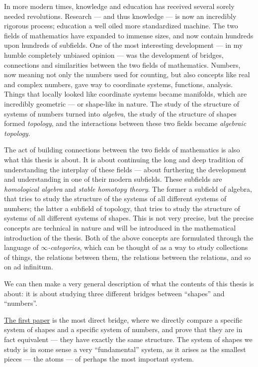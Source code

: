 In more modern times, knowledge and education has received several sorely needed revolutions. Research --- and thus knowledge --- is now an incredibly rigorous process; education a well oiled more standardized machine. The two fields of mathematics have expanded to immense sizes, and now contain hundreds upon hundreds of subfields. One of the most interesting development --- in my humble completely unbiased opinion --- was the development of bridges, connections and similarities between the two fields of mathematics. Numbers, now meaning not only the numbers used for counting, but also concepts like real and complex numbers, gave way to coordinate systems, functions, analysis. Things that locally looked like coordinate systems became manifolds, which are incredibly geometric --- or shape-like in nature. The study of the structure of systems of numbers turned into \emph{algebra}, the study of the structure of shapes formed \emph{topology}, and the interactions between these two fields became \emph{algebraic topology}. 

The act of building connections between the two fields of mathematics is also what this thesis is about. It is about continuing the long and deep tradition of understanding the interplay of these fields --- about furthering the development and understanding in one of their modern subfields. These subfields are \emph{homological algebra} and \emph{stable homotopy theory}. The former a subfield of algebra, that tries to study the structure of the systems of all different systems of numbers; the latter a subfield of topology, that tries to study the structure of systems of all different systems of shapes. This is not very precise, but the precise concepts are technical in nature and will be introduced in the mathematical introduction of the thesis. Both of the above concepts are formulated through the language of \emph{$\infty$-categories}, which can be thought of as a way to study collections of things, the relations between them, the relations between the relations, and so on ad infinitum. 

We can then make a very general description of what the contents of this thesis is about: it is about studying three different bridges between ``shapes'' and ``numbers''. 

{\hyperref[ch:2]{The first paper}} is the most direct bridge, where we directly compare a specific system of shapes and a specific system of numbers, and prove that they are in fact equivalent --- they have exactly the same structure. The system of shapes we study is in some sense a very ``fundamental'' system, as it arises as the smallest pieces --- the atoms --- of perhaps the most important system. 


